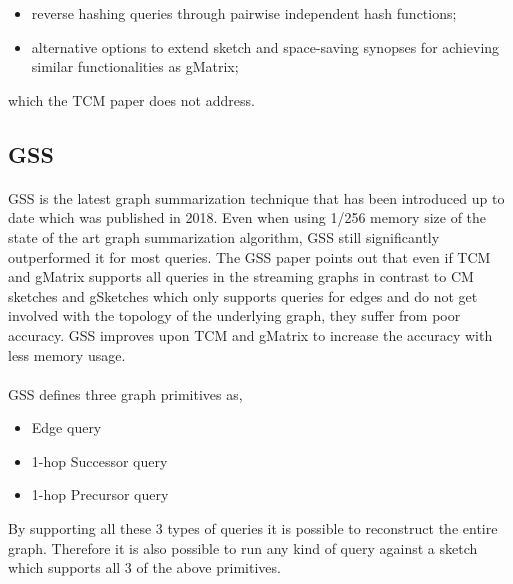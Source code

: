 \begin{itemize}
    \item reverse hashing queries through pairwise independent hash functions;
    \item alternative options to extend sketch and space-saving synopses for achieving similar functionalities as gMatrix\cite{khan_query-friendly_2016};
\end{itemize}

which the TCM paper does not address. 

\subsection{GSS}

\paragraph{}
GSS\cite{gou_fast_2018} is the latest graph summarization technique that has been introduced up to date which was published in 2018. Even when using 1/256 memory size of the state of the art graph summarization algorithm, GSS\cite{gou_fast_2018} still significantly outperformed it for most queries\cite{gou_fast_2018}. The GSS paper\cite{gou_fast_2018} points out that even if TCM\cite{tang_graph_2016} and gMatrix\cite{khan_query-friendly_2016} supports all queries in the streaming graphs in contrast to CM sketches\cite{cormode_improved_2003} and gSketches\cite{zhao_gsketch:_2011} which only supports queries for edges and do not get involved with the topology of the underlying graph, they suffer from poor accuracy. GSS\cite{gou_fast_2018} improves upon TCM\cite{tang_graph_2016} and gMatrix\cite{khan_query-friendly_2016} to increase the accuracy with less memory usage. 

\paragraph{}
GSS\cite{gou_fast_2018} defines three graph primitives as,

\begin{itemize}
    \item Edge query 
    \item 1-hop Successor query 
    \item 1-hop Precursor query
\end{itemize}

By supporting all these 3 types of queries it is possible to reconstruct the entire graph. Therefore it is also possible to run any kind of query against a sketch which supports all 3 of the above primitives. 

